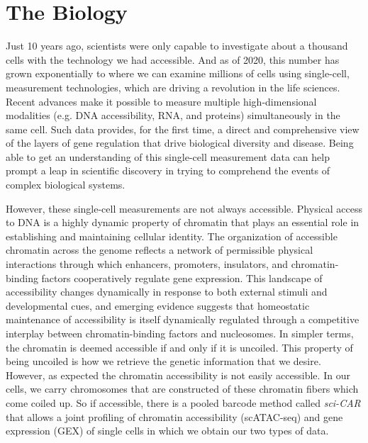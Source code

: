 \section{The Biology}

Just 10 years ago, scientists were only capable to investigate about a thousand cells with the technology we had accessible. 
And as of 2020, this number has grown exponentially to where we can examine millions of cells using single-cell, measurement technologies, which are driving a revolution in the life sciences. 
Recent advances make it possible to measure multiple high-dimensional modalities (e.g. DNA accessibility, RNA, and proteins) simultaneously in the same cell. Such data provides, for the first time, a direct and comprehensive view of the layers of gene regulation that drive biological diversity and disease. 
Being able to get an understanding of this single-cell measurement data can help prompt a leap in scientific discovery in trying to comprehend the events of complex biological systems. 

However, these single-cell measurements are not always accessible. Physical access to DNA is a highly dynamic property of chromatin that plays an essential role in establishing and maintaining cellular identity. The organization of accessible chromatin across the genome reflects a network of permissible physical interactions through which enhancers, promoters, insulators, and chromatin-binding factors cooperatively regulate gene expression. This landscape of accessibility changes dynamically in response to both external stimuli and developmental cues, and emerging evidence suggests that homeostatic maintenance of accessibility is itself dynamically regulated through a competitive interplay between chromatin-binding factors and nucleosomes. In simpler terms, the chromatin is deemed accessible if and only if it is uncoiled. This property of being uncoiled is how we retrieve the genetic information that we desire. However, as expected the chromatin accessibility is not easily accessible. In our cells, we carry chromosomes that are constructed of these chromatin fibers which come coiled up. So if accessible, there is a pooled barcode method called \emph{sci-CAR} that allows a joint profiling of chromatin accessibility (scATAC-seq) and gene expression (GEX) of single cells in which we obtain our two types of data.


